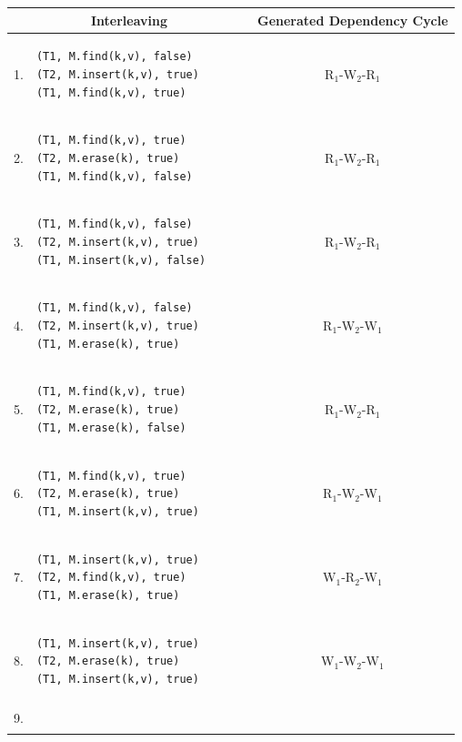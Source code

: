 \newpage
\begin{center}
    \singlespace
\begin{longtable}{|c|l|c|}
    \hline
\multicolumn{2}{|c|}{Interleaving} & Generated Dependency Cycle\\
        \hline
1. & 
\begin{lstlisting}
(T1, M.find(k,v), false)  
(T2, M.insert(k,v), true)       
(T1, M.find(k,v), true)
\end{lstlisting} &
R$_1$-W$_2$-R$_1$
       \\ 
    \hline
2. & 
\begin{lstlisting}
(T1, M.find(k,v), true)  
(T2, M.erase(k), true)       
(T1, M.find(k,v), false)
\end{lstlisting} &
R$_1$-W$_2$-R$_1$
       \\ 
    \hline
3. & 
\begin{lstlisting}
(T1, M.find(k,v), false)  
(T2, M.insert(k,v), true)       
(T1, M.insert(k,v), false)
\end{lstlisting} &
R$_1$-W$_2$-R$_1$
       \\ 
    \hline
4. & 
\begin{lstlisting}
(T1, M.find(k,v), false)  
(T2, M.insert(k,v), true)       
(T1, M.erase(k), true)
\end{lstlisting} &
R$_1$-W$_2$-W$_1$
       \\ 
    \hline
5. & 
\begin{lstlisting}
(T1, M.find(k,v), true)  
(T2, M.erase(k), true)       
(T1, M.erase(k), false)
\end{lstlisting} &
R$_1$-W$_2$-R$_1$
       \\ 
    \hline
6. & 
\begin{lstlisting}
(T1, M.find(k,v), true)  
(T2, M.erase(k), true)       
(T1, M.insert(k,v), true)
\end{lstlisting} &
R$_1$-W$_2$-W$_1$
       \\ 
    \hline
7. & 
\begin{lstlisting}
(T1, M.insert(k,v), true)  
(T2, M.find(k,v), true)       
(T1, M.erase(k), true)
\end{lstlisting} &
W$_1$-R$_2$-W$_1$
       \\ 
    \hline
8. & 
\begin{lstlisting}
(T1, M.insert(k,v), true)  
(T2, M.erase(k), true)       
(T1, M.insert(k,v), true)
\end{lstlisting} &
W$_1$-W$_2$-W$_1$
       \\ 
    \hline
9. & 
\begin{lstlisting}

\end{lstlisting}
\end{longtable}
\end{center}
